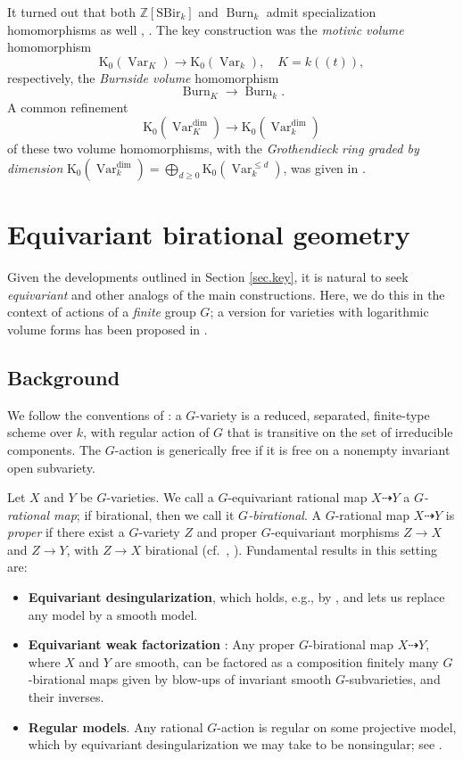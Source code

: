 \documentclass[12pt,reqno]{amsart}
\theoremstyle{plain}
\theoremstyle{remark}
\theoremstyle{definition}
\numberwithin{equation}{section}
\newcommand{\bZ}{{\mathbb Z}}
\DeclareMathOperator{\Var}{Var}
\DeclareMathOperator{\Burn}{Burn}
\begin{document}
It turned out that both $\bZ[\mathrm{SBir}_k]$ and $\Burn_k$ admit specialization homomorphisms as well \cite{nicaiseshinder}, \cite{KT}. The key construction was the {\em motivic volume} homomorphism
$$
\mathrm K_0(\Var_K) \to 
\mathrm K_0(\Var_k),  \quad K=k((t)),
$$
respectively, the {\em Burnside volume} homomorphism
$$
\Burn_K\to \Burn_k. 
$$
A common refinement
$$
\mathrm K_0(\Var_K^{\dim}) \to 
\mathrm K_0(\Var_k^{\dim})
$$
of these two volume homomorphisms, with the
\emph{Grothendieck ring graded by dimension} $\mathrm K_0(\Var_k^{\dim})=\bigoplus_{d\ge 0}\mathrm K_0(\Var_k^{\le d})$,
was given in \cite{NO-refinement}.









\section{Equivariant birational geometry}
\label{sect:basic}
Given the developments outlined in Section \ref{sec.key}, it is natural to seek {\em equivariant} and other analogs of the main constructions. 
Here, we do this in the context of actions of a \emph{finite} group $G$; a version for varieties with logarithmic volume forms has been proposed in \cite{CKT}.

\subsection{Background}
\label{sect:basic1}
We follow the conventions of \cite[Sect.\ 2]{KT-vector}:
a $G$-variety is a reduced, separated, finite-type scheme over $k$, with regular action of $G$ that is transitive on the set of irreducible components.
The $G$-action is generically free if it is free on a nonempty invariant open subvariety.

Let $X$ and $Y$ be $G$-varieties.
We call a $G$-equivariant rational map $X\dashrightarrow Y$ a \emph{$G$-rational map}; if birational, then we call it \emph{$G$-birational}.
A $G$-rational map $X\dashrightarrow Y$ is \emph{proper} if there exist a $G$-variety $Z$ and proper $G$-equivariant morphisms $Z\to X$ and $Z\to Y$, with $Z\to X$ birational (cf.\ \cite[Sect.\ 2.12]{iitaka}, \cite[App.\ A]{hassetthyeon}).
Fundamental results in this setting are:
\begin{itemize}
\item \textbf{Equivariant desingularization},
which holds, e.g., by \cite{bierstonemilman}, and lets us replace any model by a smooth model.
\item \textbf{Equivariant weak factorization}
\cite{abramovichtemkin}: Any proper $G$-birational map $X\dashrightarrow Y$, where $X$ and $Y$ are smooth, can be factored as a composition finitely many $G$-birational maps given by blow-ups of invariant smooth $G$-subvarieties, and their inverses.
\item \textbf{Regular models}.
Any rational $G$-action is regular on some projective model, which by equivariant desingularization we may take to be nonsingular; see \cite{brionmodels}.
\end{itemize}
\end{document}
